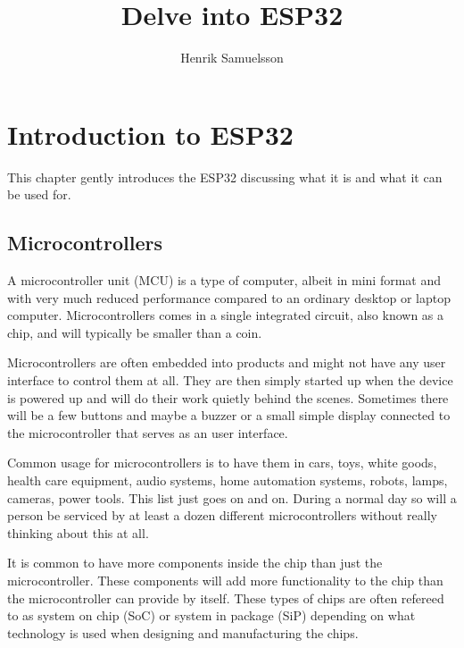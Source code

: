 \documentclass{tufte-book}
\title{Delve into ESP32}
\author{Henrik Samuelsson}
\begin{document}
\maketitle

\cleardoublepage

\tableofcontents

\chapter{Introduction to ESP32}
This chapter gently introduces the ESP32 discussing what it is and what it can 
be used for.

\section{Microcontrollers}
A microcontroller unit (MCU) is a type of computer, albeit in mini format and 
with very much reduced performance compared to an ordinary desktop or laptop 
computer. Microcontrollers comes in a single integrated circuit, also known as 
a chip, and will typically be smaller than a coin.

Microcontrollers are often embedded into products and might not have 
any user interface to control them at all. They are then simply started up when 
the device is powered up and will do their work quietly behind the scenes. 
Sometimes there will be a few buttons and maybe a buzzer or a small simple 
display connected to the microcontroller that serves as an user interface.

Common usage for microcontrollers is to have them in cars, toys, white goods, 
health care equipment, audio systems, home automation systems, robots, lamps, 
cameras, power tools. This list just goes on and on. During a normal day so 
will a person be serviced by at least a dozen different microcontrollers 
without really thinking about this at all.

It is common to have more components inside the chip than just the 
microcontroller. These components will add more functionality to the chip than 
the microcontroller can provide by itself. These types of chips are often 
refereed to as system on chip (SoC) or system in package (SiP) depending on 
what technology is used when designing and manufacturing the chips.
  
\section{}
\end{document}
